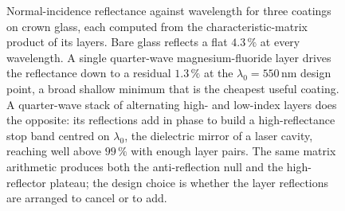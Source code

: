 \begin{figure}[htbp]
\centering
{}
\caption[Multilayer reflectance from the transfer matrix]{Normal-incidence
reflectance against wavelength for three coatings on crown glass, each computed
from the characteristic-matrix product of its layers. Bare glass reflects a
flat $4.3\,\%$ at every wavelength. A single quarter-wave magnesium-fluoride
layer drives the reflectance down to a residual $1.3\,\%$ at the
$\lambda_0 = 550\,\si{\nano\meter}$ design point, a broad shallow minimum that
is the cheapest useful coating. A quarter-wave stack of alternating high- and
low-index layers does the opposite: its reflections add in phase to build a
high-reflectance stop band centred on $\lambda_0$, the dielectric mirror of a
laser cavity, reaching well above $99\,\%$ with enough layer pairs. The same
matrix arithmetic produces both the anti-reflection null and the high-reflector
plateau; the design choice is whether the layer reflections are arranged to
cancel or to add.}
\label{fig:vol04ch11:multilayer-reflectance}
\end{figure}
